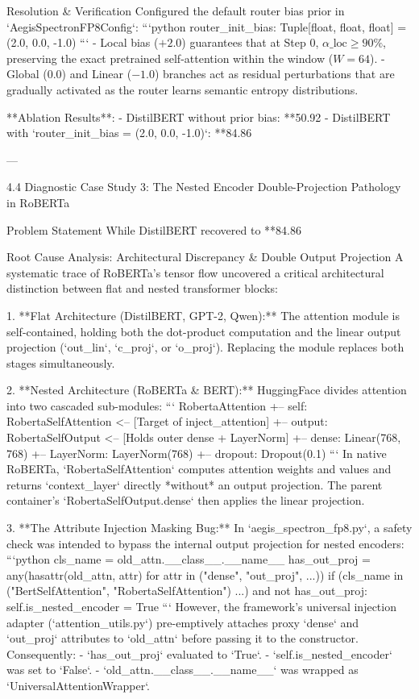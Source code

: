  Resolution \& Verification
Configured the default router bias prior in `AegisSpectronFP8Config`:
```python
router\_init\_bias: Tuple[float, float, float] = (2.0, 0.0, -1.0)
```
- Local bias ($+2.0$) guarantees that at Step 0, $\alpha\_{\text{loc}} \ge 90\%$, preserving the exact pretrained self-attention within the window ($W=64$).
- Global ($0.0$) and Linear ($-1.0$) branches act as residual perturbations that are gradually activated as the router learns semantic entropy distributions.

**Ablation Results**:
- DistilBERT without prior bias: **50.92%
- DistilBERT with `router\_init\_bias = (2.0, 0.0, -1.0)`: **84.86%

---

 4.4 Diagnostic Case Study 3: The Nested Encoder Double-Projection Pathology in RoBERTa

 Problem Statement
While DistilBERT recovered to **84.86%

 Root Cause Analysis: Architectural Discrepancy \& Double Output Projection
A systematic trace of RoBERTa's tensor flow uncovered a critical architectural distinction between flat and nested transformer blocks:

1. **Flat Architecture (DistilBERT, GPT-2, Qwen):**
   The attention module is self-contained, holding both the dot-product computation and the linear output projection (`out\_lin`, `c\_proj`, or `o\_proj`). Replacing the module replaces both stages simultaneously.

2. **Nested Architecture (RoBERTa \& BERT):**
   HuggingFace divides attention into two cascaded sub-modules:
   ```
   RobertaAttention
   +-- self: RobertaSelfAttention          <-- [Target of inject\_attention]
   +-- output: RobertaSelfOutput           <-- [Holds outer dense + LayerNorm]
         +-- dense: Linear(768, 768)
         +-- LayerNorm: LayerNorm(768)
         +-- dropout: Dropout(0.1)
   ```
   In native RoBERTa, `RobertaSelfAttention` computes attention weights and values and returns `context\_layer` directly *without* an output projection. The parent container's `RobertaSelfOutput.dense` then applies the linear projection.

3. **The Attribute Injection Masking Bug:**
   In `aegis\_spectron\_fp8.py`, a safety check was intended to bypass the internal output projection for nested encoders:
   ```python
   cls\_name = old\_attn.\_\_class\_\_.\_\_name\_\_
   has\_out\_proj = any(hasattr(old\_attn, attr) for attr in ("dense", "out\_proj", ...))
   if (cls\_name in ("BertSelfAttention", "RobertaSelfAttention") ...) and not has\_out\_proj:
       self.is\_nested\_encoder = True
   ```
   However, the framework's universal injection adapter (`attention\_utils.py`) pre-emptively attaches proxy `dense` and `out\_proj` attributes to `old\_attn` before passing it to the constructor. Consequently:
   - `has\_out\_proj` evaluated to `True`.
   - `self.is\_nested\_encoder` was set to `False`.
   - `old\_attn.\_\_class\_\_.\_\_name\_\_` was wrapped as `UniversalAttentionWrapper`.

